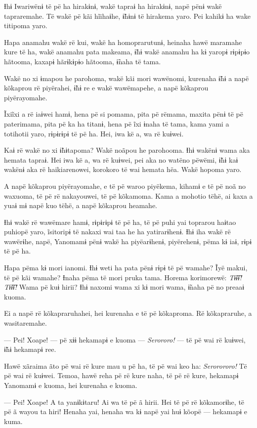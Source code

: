 Ɨhɨ Iwariwënɨ të pë ha hirakɨnɨ, wakë tapraɨ ha hirakɨnɨ, napë pënɨ wakë
tapraremahe. Të wakë pë kãi hĩihaɨhe, ɨ̃hɨnɨ të hirakema yaro. Pei kahikɨ
ha wake titipoma yaro.

Hapa anamahu wakë rë kui, wakë ha homoprarutunɨ, heinaha hawë maramahe
kure të ha, wakë anamahu pata makeama, ɨ̃hɨ wakë anamahu ha kɨ yaropɨ
rɨpɨpɨo hãtooma, kaxapɨ hãrɨkɨpɨo hãtooma, ɨ̃naha të tama. 

Wakë no xi ɨmapou he parohoma, wakë kãi mori wawënomi, kurenaha ɨ̃hɨ a
napë kõkaprou rë piyërahei, ɨ̃hɨ re e wakë wawëmapehe, a napë kõkaprou
piyërayomahe. 

Ĩxiĩxi a rë iaɨwei hamɨ, hena pë si pomama, pita pë rëmama, maxita pënɨ
të pë paterimama, pita pë ka ha titanɨ, hena pë ĩxi ɨnaha të tama, kama
yami a totihotii yaro, rɨpɨrɨpɨ të pë ha. Hei, iwa kë a, wa rë kuɨwei. 

Kaɨ rë wakë no xi ɨ̃hɨtapoma? Wakë noãpou he parohooma. Ɨhɨ wakënɨ wama
aka hemata tapraɨ. Hei iwa kë a, wa rë kuɨwei, pei aka no watëno pëwëmi,
ɨ̃hɨ kaɨ wakënɨ aka rë haikiarenowei, korokoro të wai hemata hëa. Wakë
hopoma yaro. 

A napë kõkaprou piyërayomahe, e të pë waroo piyëkema, kihamɨ e të pë noã
no waxuoma, të pë rë nakayouwei, të pë kõkamoma. Kama a mohotio tëhë, ai
kaxa a yuaɨ mɨ napë kuo tëhë, a napë kõkaprou heamahe. 

Ɨhɨ wakë rë wawëmare hamɨ, rɨpɨrɨpɨ të pë ha, të pë puhi yai toprarou
haɨtao puhiopë yaro, ĩsitoripɨ të nakaxi wai taa he ha yatirarɨhenɨ. Ɨhɨ
iha wakë rë wawërɨhe, napë, Yanomamɨ pënɨ wakë ha piyëarɨhenɨ,
piyërehenɨ, pëma kɨ iaɨ, rɨpɨ të pë ha. 

Hapa pëma kɨ mori ianomi. Ɨhɨ weti ha pata pënɨ rɨpɨ të pë wamahe? Ĩyë
makui, të pë kãi wamahe? Ɨnaha pëma të mori pruka tama. Horema
korimorewë: \textit{Tɨ̃ɨ̃ɨ̃! Tɨ̃ɨ̃ɨ̃!} Wama pë kuɨ hirii? Ɨhɨ naxomi wama xi kɨ mori
wama, ɨ̃naha pë no preaaɨ kuoma. 

Ei a napë rë kõkapraruhahei, hei kurenaha e të pë kõkaproma. Rë
kõkapraruhe, a wasitaremahe. 

--- Pei! Xoape! --- pë xɨɨ hekamapɨ e kuoma --- \textit{Serororo!} --- të pë wai
rë kuɨwei, ɨ̃hɨ hekamapɨ ree. 

Hawë xãraima ãto pë wai rë kure mau u pë ha, të pë wai keo ha:
\textit{Serorororo!} Të pë wai rë kuɨwei. Temoa, hawë reha pë rë kure naha, të pë
rë kure, hekamapɨ Yanomamɨ e kuoma, hei kurenaha e kuoma. 

--- Pei! Xoape! A ta yanɨkɨtaru! Ai wa të pë ã hirii. Hei të pë rë
kõkamorɨhe, të pë ã wayou ta hiri! Henaha yai, henaha wa kɨ napë yai huɨ
kõopë --- hekamapɨ e kuma. 


